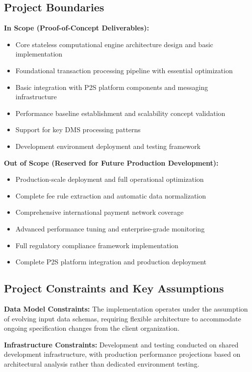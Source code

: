 \subsection{Project Boundaries}

\textbf{In Scope (Proof-of-Concept Deliverables):}
\begin{itemize}
    \item Core stateless computational engine architecture design and basic implementation
    \item Foundational transaction processing pipeline with essential optimization
    \item Basic integration with P2S platform components and messaging infrastructure
    \item Performance baseline establishment and scalability concept validation
    \item Support for key DMS processing patterns
    \item Development environment deployment and testing framework
\end{itemize}

\textbf{Out of Scope (Reserved for Future Production Development):}
\begin{itemize}
    \item Production-scale deployment and full operational optimization
    \item Complete fee rule extraction and automatic data normalization
    \item Comprehensive international payment network coverage
    \item Advanced performance tuning and enterprise-grade monitoring
    \item Full regulatory compliance framework implementation
    \item Complete P2S platform integration and production deployment
\end{itemize}

\subsection{Project Constraints and Key Assumptions}

\textbf{Data Model Constraints:}
The implementation operates under the assumption of evolving input data schemas, requiring flexible architecture to accommodate ongoing specification changes from the client organization.

\textbf{Infrastructure Constraints:}
Development and testing conducted on shared development infrastructure, with production performance projections based on architectural analysis rather than dedicated environment testing.

